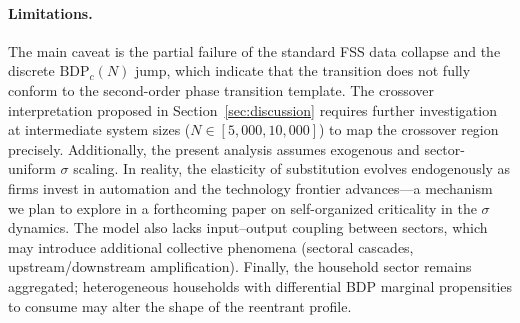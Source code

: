 \documentclass[12pt,a4paper]{article}
\begin{document}
\paragraph{Limitations.} The main caveat is the partial failure of the
standard FSS data collapse and the discrete $\mathrm{BDP}_c(N)$ jump, which
indicate that the transition does not fully conform to the second-order phase
transition template. The crossover interpretation proposed in
Section~\ref{sec:discussion} requires further investigation at intermediate
system sizes ($N \in [5{,}000, 10{,}000]$) to map the crossover region
precisely. Additionally, the present analysis assumes exogenous and
sector-uniform $\sigma$ scaling. In reality, the elasticity of substitution
evolves endogenously as firms invest in automation and the technology frontier
advances---a mechanism we plan to explore in a forthcoming paper on
self-organized criticality in the $\sigma$ dynamics. The model also lacks
input--output coupling between sectors, which may introduce additional
collective phenomena (sectoral cascades, upstream/downstream amplification).
Finally, the household sector remains aggregated; heterogeneous households with
differential BDP marginal propensities to consume may alter the shape of the
reentrant profile.

\printbibliography
\end{document}
